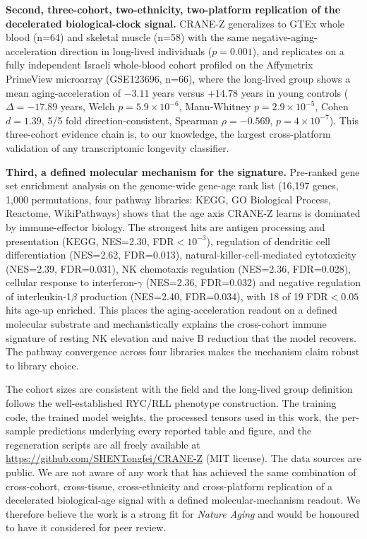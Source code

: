 \textbf{Second, three-cohort, two-ethnicity, two-platform replication of the decelerated biological-clock signal.} CRANE-Z generalizes to GTEx whole blood (n=64) and skeletal muscle (n=58) with the same negative-aging-acceleration direction in long-lived individuals ($p=0.001$), and replicates on a fully independent Israeli whole-blood cohort profiled on the Affymetrix PrimeView microarray (GSE123696, n=66), where the long-lived group shows a mean aging-acceleration of $-3.11$ years versus $+14.78$ years in young controls ($\Delta=-17.89$ years, Welch $p=5.9\times10^{-6}$, Mann-Whitney $p=2.9\times10^{-5}$, Cohen $d=1.39$, 5/5 fold direction-consistent, Spearman $\rho=-0.569$, $p=4\times10^{-7}$). This three-cohort evidence chain is, to our knowledge, the largest cross-platform validation of any transcriptomic longevity classifier.

\textbf{Third, a defined molecular mechanism for the signature.} Pre-ranked gene set enrichment analysis on the genome-wide gene-age rank list (16,197 genes, 1,000 permutations, four pathway libraries: KEGG, GO Biological Process, Reactome, WikiPathways) shows that the age axis CRANE-Z learns is dominated by immune-effector biology. The strongest hits are antigen processing and presentation (KEGG, NES=2.30, FDR$<10^{-3}$), regulation of dendritic cell differentiation (NES=2.62, FDR=0.013), natural-killer-cell-mediated cytotoxicity (NES=2.39, FDR=0.031), NK chemotaxis regulation (NES=2.36, FDR=0.028), cellular response to interferon-$\gamma$ (NES=2.36, FDR=0.032) and negative regulation of interleukin-1$\beta$ production (NES=2.40, FDR=0.034), with 18 of 19 FDR$<0.05$ hits age-up enriched. This places the aging-acceleration readout on a defined molecular substrate and mechanistically explains the cross-cohort immune signature of resting NK elevation and naive B reduction that the model recovers. The pathway convergence across four libraries makes the mechanism claim robust to library choice.

The cohort sizes are consistent with the field and the long-lived group definition follows the well-established RYC/RLL phenotype construction. The training code, the trained model weights, the processed tensors used in this work, the per-sample predictions underlying every reported table and figure, and the regeneration scripts are all freely available at \href{https://github.com/SHENTongfei/CRANE-Z}{https://github.com/SHENTongfei/CRANE-Z} (MIT license). The data sources are public. We are not aware of any work that has achieved the same combination of cross-cohort, cross-tissue, cross-ethnicity and cross-platform replication of a decelerated biological-age signal with a defined molecular-mechanism readout. We therefore believe the work is a strong fit for \textit{Nature Aging} and would be honoured to have it considered for peer review.

